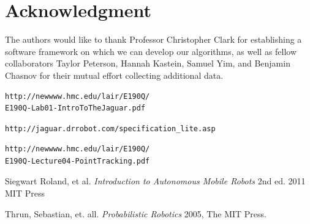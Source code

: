 \documentclass[conference]{IEEEtran}
\begin{document}
\section*{Acknowledgment}


The authors would like to thank Professor Christopher Clark for 
establishing a software framework on which we can 
develop our algorithms, as well as fellow collaborators Taylor Peterson, Hannah
Kastein, Samuel Yim, and Benjamin Chasnov for their mutual effort collecting
additional data.




\begin{thebibliography}{1}

\begin{verbatim}
http://newwww.hmc.edu/lair/E190Q/
E190Q-Lab01-IntroToTheJaguar.pdf
\end{verbatim}

\begin{verbatim}
http://jaguar.drrobot.com/specification_lite.asp
\end{verbatim}

\begin{verbatim}
http://newwww.hmc.edu/lair/E190Q/
E190Q-Lecture04-PointTracking.pdf
\end{verbatim}

Siegwart Roland, et al. \emph{Introduction to Autonomous Mobile Robots} 2nd ed. 
2011 MIT Press

Thrun, Sebastian, et. all. \emph{Probabilistic Robotics}
2005, The MIT Press.


\end{thebibliography}




\end{document}
